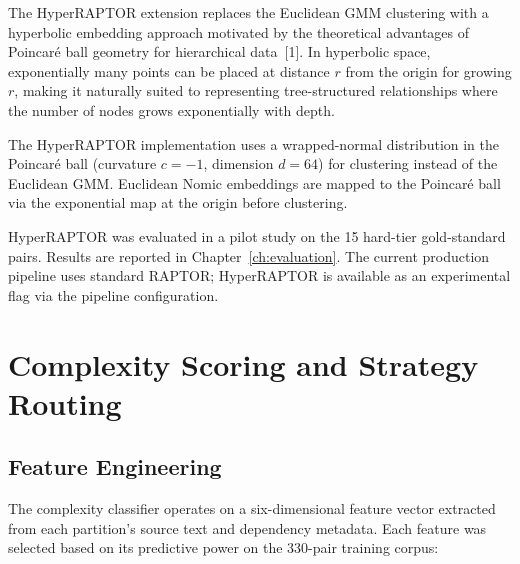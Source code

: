 The HyperRAPTOR extension replaces the Euclidean GMM clustering with a
hyperbolic embedding approach motivated by the theoretical advantages of
Poincaré ball geometry for hierarchical data~[1]. In hyperbolic space,
exponentially many points can be placed at distance $r$ from the origin for
growing $r$, making it naturally suited to representing tree-structured
relationships where the number of nodes grows exponentially with depth.

The HyperRAPTOR implementation uses a wrapped-normal distribution in the
Poincaré ball (curvature $c = -1$, dimension $d = 64$) for clustering instead
of the Euclidean GMM. Euclidean Nomic embeddings are mapped to the Poincaré
ball via the exponential map at the origin before clustering.

HyperRAPTOR was evaluated in a pilot study on the 15 hard-tier gold-standard
pairs. Results are reported in Chapter~\ref{ch:evaluation}. The current
production pipeline uses standard RAPTOR; HyperRAPTOR is available as an
experimental flag via the pipeline configuration.

\section{Complexity Scoring and Strategy Routing}
\label{sec:complexity-impl}

\subsection{Feature Engineering}
\label{subsec:feature-engineering}

The complexity classifier operates on a six-dimensional feature vector extracted
from each partition's source text and dependency metadata. Each feature was
selected based on its predictive power on the 330-pair training corpus:

